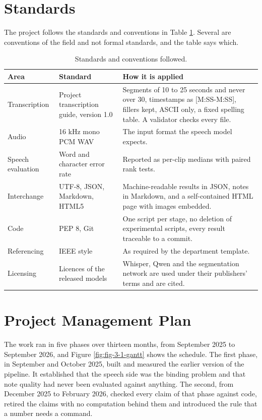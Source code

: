 \section{Standards}

The project follows the standards and conventions in Table \ref{tab:standards}. Several
are conventions of the field and not formal standards, and the table says which.

\begin{table}[htbp]
\centering
\caption{Standards and conventions followed.}
\label{tab:standards}
\small
\begin{tabular}{p{3.0cm}p{3.6cm}p{6.8cm}}
\toprule
Area & Standard & How it is applied \\
\midrule
Transcription & Project transcription guide, version 1.0 &
Segments of 10 to 25 seconds and never over 30, timestamps as [M:SS-M:SS],
fillers kept, ASCII only, a fixed spelling table. A validator checks every file. \\
\addlinespace
Audio & 16 kHz mono PCM WAV & The input format the speech model expects. \\
\addlinespace
Speech evaluation & Word and character error rate &
Reported as per-clip medians with paired rank tests. \\
\addlinespace
Interchange & UTF-8, JSON, Markdown, HTML5 &
Machine-readable results in JSON, notes in Markdown, and a self-contained HTML page with
images embedded. \\
\addlinespace
Code & PEP 8, Git &
One script per stage, no deletion of experimental scripts, every result traceable to a
commit. \\
\addlinespace
Referencing & IEEE style & As required by the department template. \\
\addlinespace
Licensing & Licences of the released models &
Whisper, Qwen and the segmentation network are used under their publishers' terms and are
cited. \\
\bottomrule
\end{tabular}
\end{table}

\section{Project Management Plan}

The work ran in five phases over thirteen months, from September 2025 to September 2026,
and Figure \ref{fig:fig-3-1-gantt} shows the schedule. The first phase, in September and
October 2025, built and measured the earlier version of the pipeline. It established that
the speech side was the binding problem and that note quality had never been evaluated
against anything. The second, from December 2025 to
February 2026, checked every claim of that phase against code, retired the claims with no
computation behind them and introduced the rule that a number needs a command.

